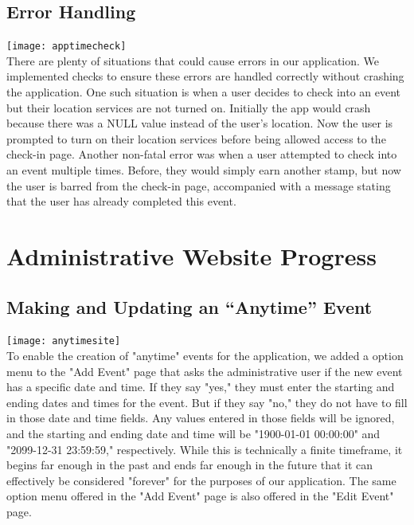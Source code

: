 \documentclass[onecolumn, draftclsnofoot,10pt, compsoc]{IEEEtran}
\begin{document}
  \subsection{Error Handling}
    \texttt{[image: apptimecheck]} \\
    There are plenty of situations that could cause errors in our application. We implemented checks to ensure these errors are handled correctly without crashing
    the application. One such situation is when a user decides to check into an event but their location services are not turned on. Initially the app would crash
    because there was a NULL value instead of the user's location. Now the user is prompted to turn on their location services before being allowed access to the check-in page.
    Another non-fatal error was when a user attempted to check into an event multiple times. Before, they would simply earn another stamp, but now the user is
    barred from the check-in page, accompanied with a message stating that the user has already completed this event.


\section{Administrative Website Progress}

  \subsection{Making and Updating an “Anytime” Event}
    \texttt{[image: anytimesite]} \\
    To enable the creation of "anytime" events for the application, we added a option menu to the "Add Event" page that asks the administrative user if the new event has a specific date and time. If they say "yes," they must enter the starting and ending dates and times for the event. But if they say "no," they do not have to fill in those date and time fields. Any values entered in those fields will be ignored, and the starting and ending date and time will be "1900-01-01 00:00:00" and "2099-12-31 23:59:59," respectively. While this is technically a finite timeframe, it begins far enough in the past and ends far enough in the future that it can effectively be considered "forever" for the purposes of our application. The same option menu offered in the "Add Event" page is also offered in the "Edit Event" page.
\end{document}
